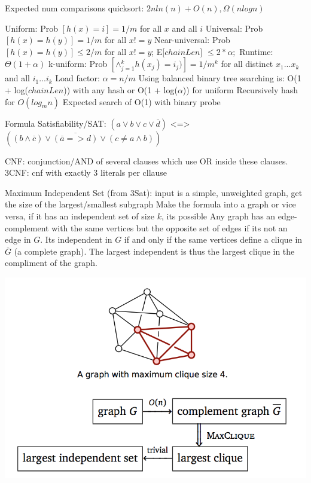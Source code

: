 \begin{algorithmic}[1]
		\EndFor
		\Else
		\EndIf
	\EndFunction
\end{algorithmic}

Expected num comparisons  quicksort: $2nln(n) + O(n), \Omega(nlogn)$


Uniform: Prob $[h(x) = i] = 1/m$ for all $x$ and all $i$
Universal: Prob $[h(x) = h(y)] = 1/m$ for all $x != y$
Near-universal: Prob $[h(x) = h(y)] \leq 2/m$ for all $x != y$; E[$chainLen$] $\leq 2*\alpha;$ Runtime: $\Theta(1 + \alpha)$
k-uniform: Prob $ [ \wedge{}_{j=1}^{k} h(x_j) = i_j) ] = 1 / m^{k}$ for all distinct $x_1...x_k$ and all $i_1...i_k$
Load factor: $\alpha = n/m$
Using balanced binary tree searching is: O(1 + log($chainLen$)) with any hash or O(1 + log($\alpha$)) for uniform
Recursively hash for $O(log_{m}{n})$
Expected search of O(1) with binary probe


Formula Satisfiability/SAT: 
$(a \vee b \vee c \vee \overbar{d})$ <=>  $((b \wedge \overbar{c}) \vee \overbar{ ( \overbar{a} => d) } \vee (c \neq a \wedge b)) $

CNF: conjunction/AND of several clauses which use OR inside these clauses.
3CNF: cnf with exactly 3 literals per cllause

Maximum Independent Set (from 3Sat): input is a simple, unweighted graph, get the size of the largest/smallest subgraph
Make the formula into a graph or vice versa, if it has an independent set of size $k$, its possible
Any graph has an edge-complement with the same vertices but the opposite set of edges if its not an edge in $G$. Its independent in $G$ if and only if the same vertices define a clique in $\overbar{G}$ (a complete graph). The largest independent is thus the largest clique in the compliment of the graph.

\includegraphics[width=\linewidth]{images/maxclique.png}

